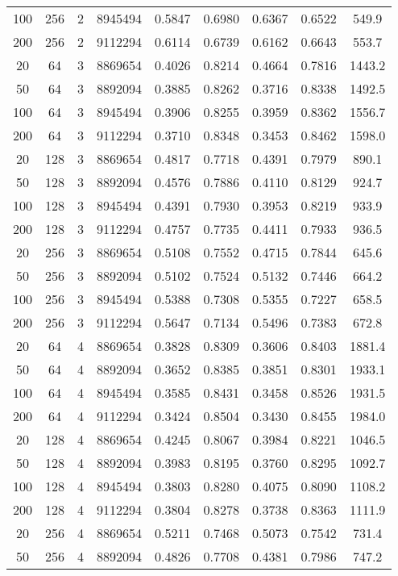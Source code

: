 \documentclass[letterpaper, 10pt]{article}
\begin{document}
\begin{longtable}{c | c | c | c | c | c | c | c | c}
100 & 256 & 2 & 8945494 & 0.5847 & 0.6980 & 0.6367 & 0.6522 & 549.9 \\
200 & 256 & 2 & 9112294 & 0.6114 & 0.6739 & 0.6162 & 0.6643 & 553.7 \\
\hline
20 & 64 & 3 & 8869654 & 0.4026 & 0.8214 & 0.4664 & 0.7816 & 1443.2 \\
50 & 64 & 3 & 8892094 & 0.3885 & 0.8262 & 0.3716 & 0.8338 & 1492.5 \\
100 & 64 & 3 & 8945494 & 0.3906 & 0.8255 & 0.3959 & 0.8362 & 1556.7 \\
200 & 64 & 3 & 9112294 & 0.3710 & 0.8348 & 0.3453 & 0.8462 & 1598.0 \\
20 & 128 & 3 & 8869654 & 0.4817 & 0.7718 & 0.4391 & 0.7979 & 890.1 \\
50 & 128 & 3 & 8892094 & 0.4576 & 0.7886 & 0.4110 & 0.8129 & 924.7 \\
100 & 128 & 3 & 8945494 & 0.4391 & 0.7930 & 0.3953 & 0.8219 & 933.9 \\
200 & 128 & 3 & 9112294 & 0.4757 & 0.7735 & 0.4411 & 0.7933 & 936.5 \\
20 & 256 & 3 & 8869654 & 0.5108 & 0.7552 & 0.4715 & 0.7844 & 645.6 \\
50 & 256 & 3 & 8892094 & 0.5102 & 0.7524 & 0.5132 & 0.7446 & 664.2 \\
100 & 256 & 3 & 8945494 & 0.5388 & 0.7308 & 0.5355 & 0.7227 & 658.5 \\
200 & 256 & 3 & 9112294 & 0.5647 & 0.7134 & 0.5496 & 0.7383 & 672.8 \\
\hline
20 & 64 & 4 & 8869654 & 0.3828 & 0.8309 & 0.3606 & 0.8403 & 1881.4 \\
50 & 64 & 4 & 8892094 & 0.3652 & 0.8385 & 0.3851 & 0.8301 & 1933.1 \\
100 & 64 & 4 & 8945494 & 0.3585 & 0.8431 & 0.3458 & 0.8526 & 1931.5 \\
200 & 64 & 4 & 9112294 & 0.3424 & 0.8504 & 0.3430 & 0.8455 & 1984.0 \\
20 & 128 & 4 & 8869654 & 0.4245 & 0.8067 & 0.3984 & 0.8221 & 1046.5 \\
50 & 128 & 4 & 8892094 & 0.3983 & 0.8195 & 0.3760 & 0.8295 & 1092.7 \\
100 & 128 & 4 & 8945494 & 0.3803 & 0.8280 & 0.4075 & 0.8090 & 1108.2 \\
200 & 128 & 4 & 9112294 & 0.3804 & 0.8278 & 0.3738 & 0.8363 & 1111.9 \\
20 & 256 & 4 & 8869654 & 0.5211 & 0.7468 & 0.5073 & 0.7542 & 731.4 \\
50 & 256 & 4 & 8892094 & 0.4826 & 0.7708 & 0.4381 & 0.7986 & 747.2 \\

\end{longtable}
\end{document}
